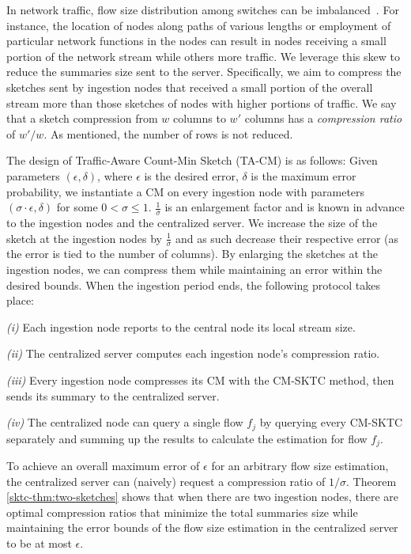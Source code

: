 In network traffic, flow size distribution among switches can be imbalanced~\cite{Niagara, Sadeh19}.  For instance, the location of nodes along paths of various lengths or employment of particular network functions in the nodes can result in nodes receiving a small portion of the network stream while others more traffic.
We leverage this skew to reduce the summaries size sent to the server. Specifically, we aim to compress the sketches sent by ingestion nodes that received a small portion of the overall stream more than those sketches of nodes with higher portions of traffic. We say that a sketch   compression from $w$ columns to $w'$ columns has a \emph{compression ratio} of $w'/w$. 
As mentioned, the number of rows is not reduced. 



The design of Traffic-Aware Count-Min Sketch (TA-CM) is as follows: Given parameters $(\epsilon,\delta)$, where $\epsilon$ is the desired error, $\delta$ is the maximum error probability, we instantiate a CM on every ingestion node with parameters $(\sigma \cdot \epsilon, \delta)$ for some $0 < \sigma \leq 1$. $\frac{1}{\sigma}$ is an enlargement factor and is known in advance to the ingestion nodes and the centralized server. We increase the size of the sketch at the ingestion nodes by $\frac{1}{\sigma}$ and as such decrease their respective error (as the error is tied to the number of columns). By enlarging the sketches at the ingestion nodes, we can compress them while maintaining an error within the desired bounds. When the ingestion period ends, the following protocol takes place:

\emph{(i)} Each ingestion node reports to the central node its local stream size.

\emph{(ii)} The centralized server computes each ingestion node's compression ratio.

\emph{(iii)} Every ingestion node compresses its CM with the CM-SKTC method, then sends its summary to the centralized server.

\emph{(iv)} The centralized node can query a single flow $f_j$ by querying every CM-SKTC separately and summing up the results to calculate the estimation for flow $f_j$.

To achieve an overall maximum error of $\epsilon$ for an arbitrary flow size estimation, the centralized server can (naively) request a compression ratio of $1 / \sigma$. Theorem \ref{sktc-thm:two-sketches} shows that when there are two ingestion nodes, there are optimal compression ratios that minimize the total summaries size while maintaining the error bounds of the flow size estimation in the centralized server to be at most $\epsilon$.

